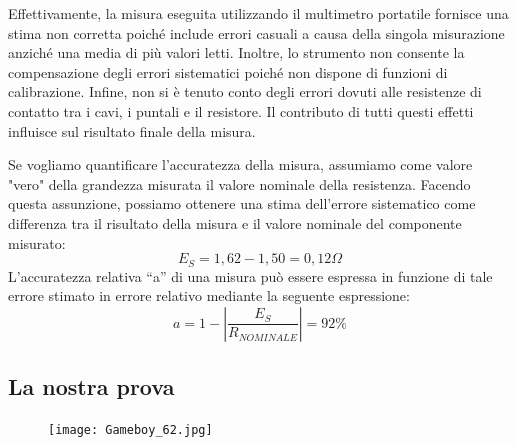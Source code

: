 Effettivamente, la misura eseguita utilizzando il multimetro portatile fornisce una stima non corretta poiché include errori casuali a causa della singola misurazione anziché una media di più valori letti. Inoltre, lo strumento non consente la compensazione degli errori sistematici poiché non dispone di funzioni di calibrazione. Infine, non si è tenuto conto degli errori dovuti alle resistenze di contatto tra i cavi, i puntali e il resistore. Il contributo di tutti questi effetti influisce sul risultato finale della misura.

Se vogliamo quantificare l'accuratezza della misura, assumiamo come valore "vero" della grandezza misurata il valore nominale della resistenza. Facendo questa assunzione, possiamo ottenere una stima dell'errore sistematico come differenza tra il risultato della misura e il valore nominale del componente misurato:
\begin{equation}
    E_S = 1,62 - 1,50 = 0,12\Omega
\end{equation}
L’accuratezza relativa “a” di una misura può essere espressa in funzione di tale errore 
stimato in errore relativo mediante la seguente espressione: 
\begin{equation}
     a = 1 - \left| \frac{E_S}{R_{NOMINALE}}\right| = 92\%
\end{equation}
\clearpage

\subsection*{La nostra prova}
\label{sub:nosta_prova_first}

\vspace{0.5cm}
\FloatBarrier
\begin{figure}
    \centering
    \texttt{[image: Gameboy\_62.jpg]}
    \label{fig:mult_port_nostro}
\end{figure}
\FloatBarrier
    
